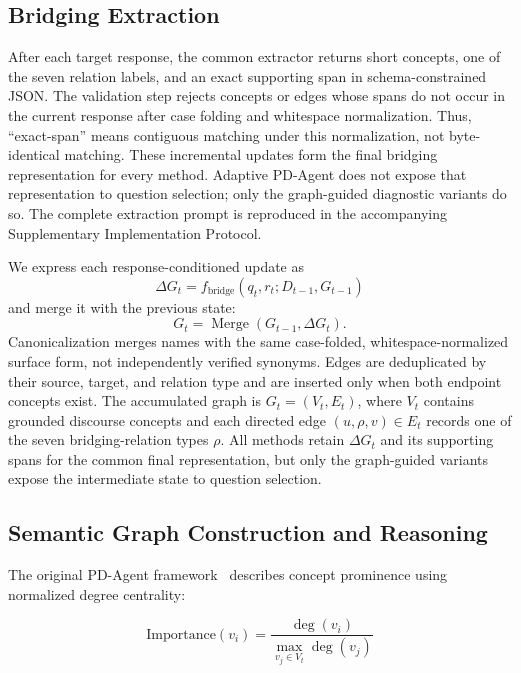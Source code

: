 \documentclass{ieeeaccess}
\begin{document}
\subsection{Bridging Extraction}
After each target response, the common extractor returns short concepts, one of the seven
relation labels, and an exact supporting span in schema-constrained JSON. The validation
step rejects concepts or edges whose spans do not occur in the current response after
case folding and whitespace normalization. Thus, ``exact-span'' means contiguous matching
under this normalization, not byte-identical matching. These incremental
updates form the final bridging representation for every method. Adaptive PD-Agent does not
expose that representation to question selection; only the graph-guided diagnostic variants
do so. The complete extraction prompt is reproduced in the accompanying
Supplementary Implementation Protocol.

We express each response-conditioned update as
\begin{equation}
\Delta G_t=f_{\mathrm{bridge}}(q_t,r_t;D_{t-1},G_{t-1})
\end{equation}
and merge it with the previous state:
\begin{equation}
G_t=\operatorname{Merge}(G_{t-1},\Delta G_t).
\label{eq:incremental_graph}
\end{equation}
Canonicalization merges names with the same case-folded, whitespace-normalized surface
form, not independently verified synonyms. Edges are deduplicated by their source,
target, and relation type and are inserted only when both endpoint concepts exist.
The accumulated graph is $G_t=(V_t,E_t)$, where $V_t$ contains grounded
discourse concepts and each directed edge $(u,\rho,v)\in E_t$ records one of the seven
bridging-relation types $\rho$. All methods retain $\Delta G_t$ and its supporting spans for
the common final representation, but only the graph-guided variants expose the intermediate
state to question selection.

\subsection{Semantic Graph Construction and Reasoning}

The original PD-Agent framework~\cite{yang2026pragmatic} describes concept prominence
using normalized degree centrality:

\begin{equation}
\mathrm{Importance}(v_i)
=
\frac{\deg(v_i)}{\max_{v_j \in V_t} \deg(v_j)}
\label{eq:importance}
\end{equation}
\end{document}
